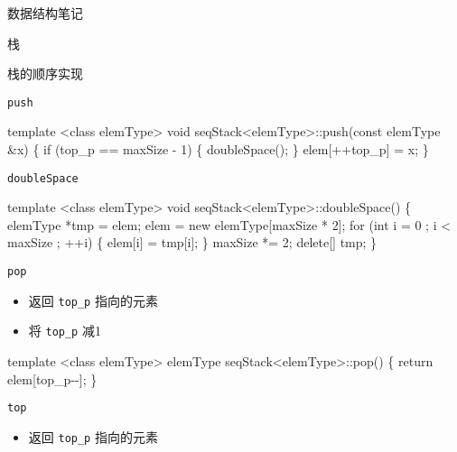\documentclass[
  ignorenonframetext,
]{beamer}
\newenvironment{Shaded}{}{}
\newcommand{\NormalTok}[1]{#1}
\providecommand{\tightlist}{%
  \setlength{\itemsep}{0pt}\setlength{\parskip}{0pt}}
\begin{document}
\begin{frame}[fragile]{数据结构笔记}
\begin{block}{栈}
\begin{block}{栈的顺序实现}
\begin{block}{\texttt{push}}
\begin{Shaded}
\begin{Highlighting}[]
\NormalTok{template \textless{}class elemType\textgreater{}}
\NormalTok{void seqStack\textless{}elemType\textgreater{}::push(const elemType \&x)}
\NormalTok{\{}
\NormalTok{  if (top\_p == maxSize {-} 1)}
\NormalTok{  \{}
\NormalTok{    doubleSpace();}
\NormalTok{  \}}
\NormalTok{  elem[++top\_p] = x;}
\NormalTok{\}}
\end{Highlighting}
\end{Shaded}

\begin{block}{\texttt{doubleSpace}}
\protect{}\label{doublespace}
\begin{Shaded}
\begin{Highlighting}[]
\NormalTok{template \textless{}class elemType\textgreater{}}
\NormalTok{void seqStack\textless{}elemType\textgreater{}::doubleSpace()}
\NormalTok{\{}
\NormalTok{  elemType *tmp = elem;}
\NormalTok{  elem = new elemType[maxSize * 2];}
\NormalTok{  for (int i = 0 ; i \textless{} maxSize ; ++i)}
\NormalTok{  \{}
\NormalTok{    elem[i] = tmp[i];}
\NormalTok{  \}}
\NormalTok{  maxSize *= 2;}
\NormalTok{  delete[] tmp;}
\NormalTok{\}}
\end{Highlighting}
\end{Shaded}
\end{block}

\begin{block}{\texttt{pop}}
\protect{}\label{pop}
\begin{itemize}
\tightlist
\item
  返回 \texttt{top\_p} 指向的元素
\item
  将 \texttt{top\_p} 减1
\end{itemize}

\begin{Shaded}
\begin{Highlighting}[]
\NormalTok{template \textless{}class elemType\textgreater{}}
\NormalTok{elemType seqStack\textless{}elemType\textgreater{}::pop()}
\NormalTok{\{}
\NormalTok{  return elem[top\_p{-}{-}];}
\NormalTok{\}}
\end{Highlighting}
\end{Shaded}
\end{block}

\begin{block}{\texttt{top}}
\protect{}\label{top}
\begin{itemize}
\tightlist
\item
  返回 \texttt{top\_p} 指向的元素
\end{itemize}


\end{block}
\end{block}
\end{block}
\end{block}
\end{frame}
\end{document}
